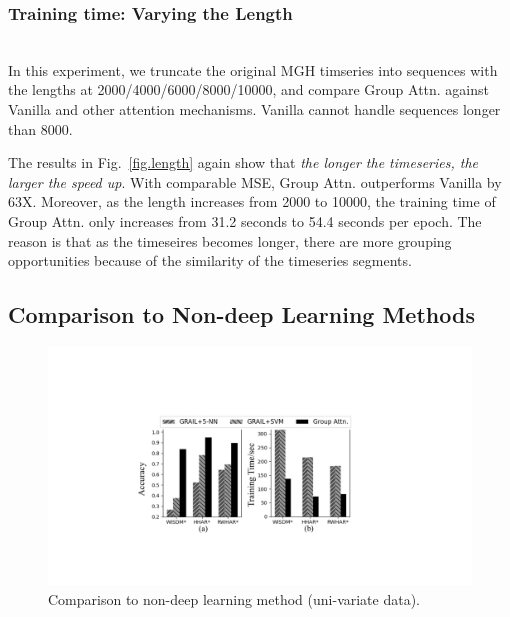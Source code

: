 
\subsubsection{Training time: Varying the Length\nopunct}\ \\
\label{sec.exp.efficiency.length}
In this experiment, we truncate the original MGH timseries into sequences with the lengths at 2000/4000/6000/8000/10000, and compare Group Attn. against Vanilla and other attention mechanisms. Vanilla cannot handle sequences longer than 8000.

The results in Fig.~\ref{fig.length} again show that \textit{the longer the timeseries, the larger the speed up}. With comparable MSE, Group Attn. outperforms Vanilla by 63X.
Moreover, as the length increases from 2000 to 10000, the training time of Group Attn. only increases from 31.2 seconds to 54.4 seconds per epoch.
The reason is that as the timeseires becomes longer, there are more grouping opportunities because of the similarity of the timeseries segments. 

\subsection{Comparison to Non-deep Learning Methods}
\label{sec.exp.univariate}

\begin{figure}[t]
\vspace{-2mm}
    \centering
    \includegraphics[width=0.8\columnwidth]{figures/uni_bar.pdf}
    \vspace{-4mm}
    \caption{Comparison to non-deep learning method (uni-variate data).}
    \label{fig.full_uni}
    \vspace{-5mm}
\end{figure}

